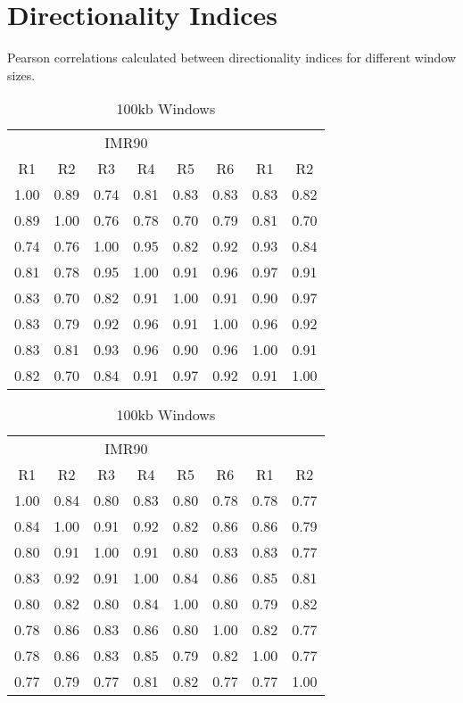 \newpage
\section*{Directionality Indices}\label{sec:SuppDirectionality}

Pearson correlations calculated between directionality indices for different window sizes.

\begin{table}[th]
  \caption{Directionality Indices}
  \parbox{.45\linewidth}{%
    \centering
    \caption{1Mb Windows}\label{tab:SuppDi1MBWindows}
    \begin{tabular}{*{8}{c}}
      \toprule
      \multicolumn{6}{c}{IMR90}
      \multicolumn{2}{c}{hESC}\\
      R1 & R2 & R3 & R4 & R5 & R6 & R1 & R2 \\
      \midrule
      1.00 & 0.89 & 0.74 & 0.81 & 0.83 & 0.83 & 0.83 & 0.82 \\
      0.89 & 1.00 & 0.76 & 0.78 & 0.70 & 0.79 & 0.81 & 0.70 \\
      0.74 & 0.76 & 1.00 & 0.95 & 0.82 & 0.92 & 0.93 & 0.84 \\
      0.81 & 0.78 & 0.95 & 1.00 & 0.91 & 0.96 & 0.97 & 0.91 \\
      0.83 & 0.70 & 0.82 & 0.91 & 1.00 & 0.91 & 0.90 & 0.97 \\
      0.83 & 0.79 & 0.92 & 0.96 & 0.91 & 1.00 & 0.96 & 0.92 \\
      0.83 & 0.81 & 0.93 & 0.96 & 0.90 & 0.96 & 1.00 & 0.91 \\
      0.82 & 0.70 & 0.84 & 0.91 & 0.97 & 0.92 & 0.91 & 1.00 \\
      \bottomrule
    \end{tabular}
  }

  \hfill

  \parbox{.45\linewidth}{%
    \centering
    \caption{100kb Windows}\label{tab:SuppDi100kbWindows}
    \begin{tabular}{*{8}{c}}
      \toprule
      \multicolumn{6}{c}{IMR90}
      \multicolumn{2}{c}{hESC} \\
      R1 & R2 & R3 & R4 & R5 & R6 & R1 & R2 \\
      \midrule
      1.00 & 0.84 & 0.80 & 0.83 & 0.80 & 0.78 & 0.78 & 0.77 \\
      0.84 & 1.00 & 0.91 & 0.92 & 0.82 & 0.86 & 0.86 & 0.79 \\
      0.80 & 0.91 & 1.00 & 0.91 & 0.80 & 0.83 & 0.83 & 0.77 \\
      0.83 & 0.92 & 0.91 & 1.00 & 0.84 & 0.86 & 0.85 & 0.81 \\
      0.80 & 0.82 & 0.80 & 0.84 & 1.00 & 0.80 & 0.79 & 0.82 \\
      0.78 & 0.86 & 0.83 & 0.86 & 0.80 & 1.00 & 0.82 & 0.77 \\
      0.78 & 0.86 & 0.83 & 0.85 & 0.79 & 0.82 & 1.00 & 0.77 \\
      0.77 & 0.79 & 0.77 & 0.81 & 0.82 & 0.77 & 0.77 & 1.00 \\
      \bottomrule
    \end{tabular}
  }
\end{table}
